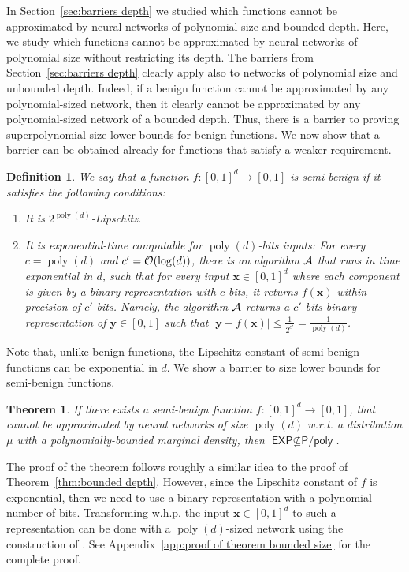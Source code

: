 \documentclass[11pt]{article}
\newtheorem{theorem}{Theorem}[section]
\newtheorem{definition}{Definition}[section]
\newcommand{\bx}{\mathbf{x}}
\newcommand{\by}{\mathbf{y}}
\newcommand{\co}{{\cal O}}
\newcommand{\ca}{{\cal A}}
\DeclareMathOperator{\poly}{poly}
\newcommand{\Ppoly}{\textsf{P/poly}}
\newcommand{\EXP}{\textsf{EXP}}
\begin{document}
In Section~\ref{sec:barriers depth} we studied which functions cannot be approximated by neural networks of polynomial size and bounded depth. Here, we study which functions cannot be approximated by neural networks of polynomial size without restricting its depth. The barriers from Section~\ref{sec:barriers depth} clearly apply also to networks of polynomial size and unbounded depth. 
Indeed, if a benign function cannot be approximated by any polynomial-sized network, then it clearly cannot be approximated by any polynomial-sized network of a bounded depth.
Thus, there is a barrier to proving 
superpolynomial size lower bounds for benign functions.
We now show that a barrier can be obtained already for functions that satisfy a weaker requirement.
\begin{definition}
We say that a function $f:[0,1]^d \rightarrow [0,1]$ is {\em semi-benign} if it satisfies the following conditions:
\begin{enumerate}
	\item It is $2^{\poly(d)}$-Lipschitz.
	\item It is exponential-time computable for $\poly(d)$-bits inputs: For every  $c = \poly(d)$ and $c'=\co(\log(d))$, there is an  algorithm $\ca$ that runs in time exponential in $d$, such that for every input $\bx \in [0,1]^d$ where each component is given by a binary representation with $c$ bits, it returns $f(\bx)$ within precision of $c'$ bits.
	Namely, the algorithm $\ca$ returns a $c'$-bits binary representation of $\by \in [0,1]$ such that $|\by-f(\bx)| \leq \frac{1}{2^{c'}} = \frac{1}{\poly(d)}$.
\end{enumerate}
\end{definition}	
Note that, unlike benign functions, the Lipschitz constant of semi-benign functions can be exponential in $d$.
We show a barrier to size lower bounds for semi-benign functions.

\begin{theorem}
\label{thm:bounded size}
	If there exists a semi-benign function $f:[0,1]^d \rightarrow [0,1]$, that cannot be approximated by neural networks of size $\poly(d)$ w.r.t. a distribution $\mu$ with a polynomially-bounded marginal density, then $\EXP \not \subseteq \Ppoly$.
\end{theorem}
The proof of the theorem follows roughly a similar idea to the proof of Theorem~\ref{thm:bounded depth}. However, since the Lipschitz constant of $f$ is exponential, then we need to use a binary representation with a polynomial number of bits. Transforming w.h.p. the input $\bx \in [0,1]^d$ to such a representation can be done with a $\poly(d)$-sized network using the construction of \cite{telgarsky2016benefits}. See Appendix~\ref{app:proof of theorem bounded size} for the complete proof.
\end{document}
